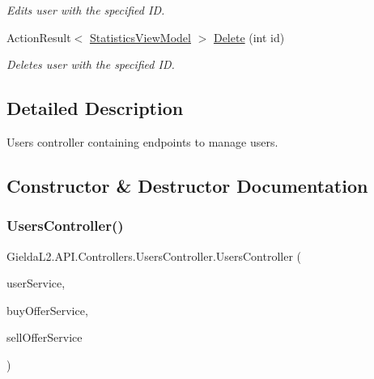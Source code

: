 \begin{DoxyCompactItemize}
\begin{DoxyCompactList}\small\item\em Edits user with the specified ID. \end{DoxyCompactList}\item 
Action\+Result$<$ \mbox{\hyperlink{class_gielda_l2_1_1_a_p_i_1_1_view_models_1_1_view_1_1_statistics_view_model}{Statistics\+View\+Model}} $>$ \mbox{\hyperlink{class_gielda_l2_1_1_a_p_i_1_1_controllers_1_1_users_controller_afab7b766c848638cb06d1a668a7f417c}{Delete}} (int id)
\begin{DoxyCompactList}\small\item\em Deletes user with the specified ID. \end{DoxyCompactList}\end{DoxyCompactItemize}


\subsection{Detailed Description}
Users controller containing endpoints to manage users. 



\subsection{Constructor \& Destructor Documentation}
\mbox{\label{class_gielda_l2_1_1_a_p_i_1_1_controllers_1_1_users_controller_af2f6c27f585aa2ef61809b7e9ec83fe2}} 
\subsubsection{\texorpdfstring{UsersController()}{UsersController()}}
{\footnotesize\ttfamily Gielda\+L2.\+A\+P\+I.\+Controllers.\+Users\+Controller.\+Users\+Controller (\begin{DoxyParamCaption}\item[{\mbox{\hyperlink{interface_gielda_l2_1_1_i_n_f_r_a_s_t_r_u_c_t_u_r_e_1_1_interfaces_1_1_i_user_service}{I\+User\+Service}}}]{user\+Service,  }\item[{\mbox{\hyperlink{interface_gielda_l2_1_1_i_n_f_r_a_s_t_r_u_c_t_u_r_e_1_1_interfaces_1_1_i_buy_offer_service}{I\+Buy\+Offer\+Service}}}]{buy\+Offer\+Service,  }\item[{\mbox{\hyperlink{interface_gielda_l2_1_1_i_n_f_r_a_s_t_r_u_c_t_u_r_e_1_1_interfaces_1_1_i_sell_offer_service}{I\+Sell\+Offer\+Service}}}]{sell\+Offer\+Service }\end{DoxyParamCaption})}



